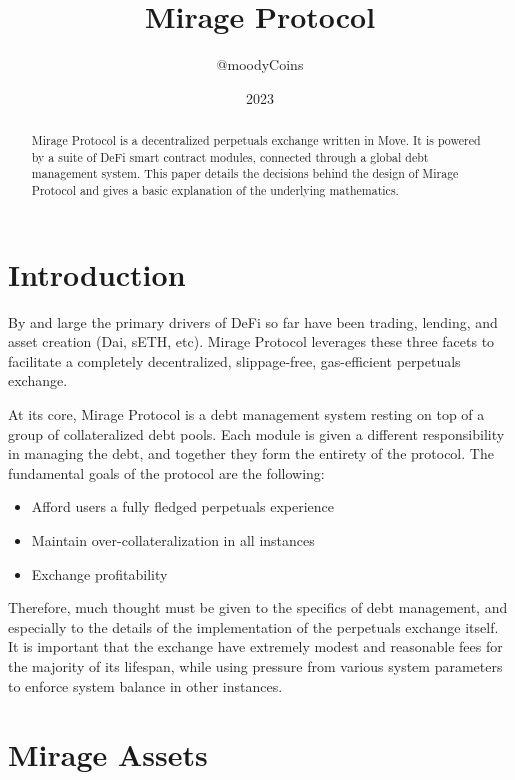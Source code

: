 \documentclass[letterpaper]{article}
\title{Mirage Protocol}
\author{@moodyCoins}
\date{2023}
\begin{document}
\maketitle


\begin{abstract}
    Mirage Protocol is a decentralized perpetuals exchange written in Move. It is powered by a suite of DeFi smart contract modules, connected through a global debt management system. This paper details the decisions behind the design of Mirage Protocol and gives a basic explanation of the underlying mathematics.
\end{abstract}

\begin{multicols}{2}

\section{Introduction}

By and large the primary drivers of DeFi so far have been trading, lending, and asset creation (Dai, sETH, etc). Mirage Protocol leverages these three facets to facilitate a completely decentralized, slippage-free, gas-efficient perpetuals exchange.

At its core, Mirage Protocol is a debt management system resting on top of a group of collateralized debt pools. Each module is given a different responsibility in managing the debt, and together they form the entirety of the protocol. The fundamental goals of the protocol are the following:

\begin{itemize}
    \item Afford users a fully fledged perpetuals experience
    \item Maintain over-collateralization in all instances
    \item Exchange profitability
\end{itemize}

Therefore, much thought must be given to the specifics of debt management, and especially to the details of the implementation of the perpetuals exchange itself. It is important that the exchange have extremely modest and reasonable fees for the majority of its lifespan, while using pressure from various system parameters to enforce system balance in other instances. 

\section{Mirage Assets}


\end{multicols}
\end{document}
